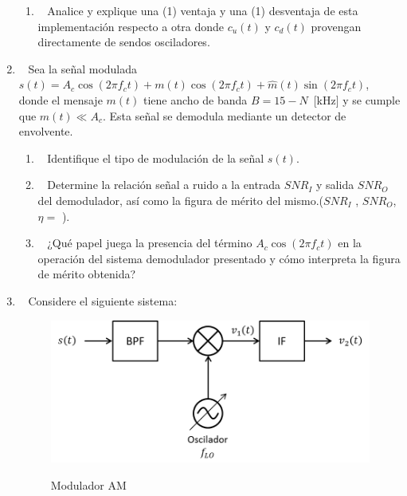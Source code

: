 \begin{enumerate}
\begin{enumerate}
	
	\item~ Analice y explique una (1) ventaja y una (1) desventaja de esta implementación respecto a otra donde $c_u(t)$ y $c_d(t)$ provengan directamente de sendos osciladores.\\
	
\end{enumerate}
\item~ Sea la señal modulada $s(t) = A_c \cos(2\pi f_c t) + m(t)\cos(2\pi   f_c t) + \widehat{m}(t)\sin(2\pi f_c t) $, donde el mensaje $m(t)$ tiene ancho de banda 
$B= 15-N$~[kHz] y se cumple que $m(t)\ll A_c$. Esta señal se demodula mediante un detector de envolvente. 

\begin{enumerate}
	\item~ Identifique el tipo de modulación de la señal $s(t)$.
	\item~ Determine la relación señal a ruido a la entrada $SNR_I$ y salida $SNR_O$ del
	demodulador, así como la figura de mérito del mismo.($SNR_I $ , $SNR_O $,
	$\eta = $ ).
	
	\item~ ¿Qué papel juega la presencia del término $A_c \cos(2\pi f_c t)$ en la operación del sistema demodulador presentado y cómo interpreta la figura de mérito obtenida?\\
	
\end{enumerate}


\item~ Considere el siguiente sistema:

\vspace{200px}
\begin{figure}[h!]
	\captionsetup{justification = raggedright, singlelinecheck = false}
	\caption{Modulador AM} 
	\centering
	\includegraphics[scale=0.65]{Imagenes/2014.png}
	\label{fig:2014}
\end{figure}



\end{enumerate}
